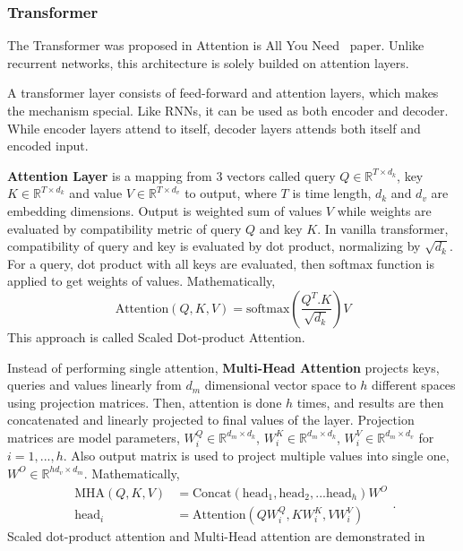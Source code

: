 \subsubsection{Transformer}

The Transformer was proposed in Attention is All You Need~ \cite{vaswani_attention_2017} paper. 
Unlike recurrent networks, this architecture is solely builded on attention layers. 

A transformer layer consists of feed-forward and attention layers, which makes the mechanism special. 
Like RNNs, it can be used as both encoder and decoder. 
While encoder layers attend to itself, decoder layers attends both itself and encoded input. 

\textbf{Attention Layer} is a mapping from 3 vectors called query $Q \in \mathbb{R}^{T \times d_k}$, key $K \in \mathbb{R}^{T \times d_k}$ and value $V \in \mathbb{R}^{T \times d_v}$ to output, 
where $T$ is time length, $d_k$ and $d_v$ are embedding dimensions. 
Output is weighted sum of values $V$ while weights are evaluated by compatibility metric of query $Q$ and key $K$. 
In vanilla transformer, compatibility of query and key is evaluated by dot product, normalizing by $\sqrt{d_k}$. 
For a query, dot product with all keys are evaluated, then softmax function is applied to get weights of values. Mathematically, 
\begin{equation}
\mathrm{Attention}(Q, K, V) = \mathrm{softmax}(\frac{Q^{T}. K}{\sqrt{d_k}}) V
\end{equation}
This approach is called Scaled Dot-product Attention. 

Instead of performing single attention, \textbf{Multi-Head Attention} projects keys, queries and values linearly from $d_m$ dimensional vector space to $h$ different spaces using projection matrices. 
Then, attention is done $h$ times, and results are then concatenated and linearly projected to final values of the layer.
Projection matrices are model parameters, $W^Q_i \in \mathbb{R}^{d_m \times d_k}$, $W^K_i \in \mathbb{R}^{d_m \times d_k}$, $W^V_i \in \mathbb{R}^{d_m \times d_v}$ for $i=1,...,h$. 
Also output matrix is used to project multiple values into single one, $W^O \in \mathbb{R}^{h d_v \times d_m}$. Mathematically, 
\begin{equation}
\begin{split}
\mathrm{MHA}(Q,K,V) &=  \text{Concat}(\mathrm{head}_1, \mathrm{head}_2, ... \mathrm{head}_h)W^O \\
\mathrm{head}_i &=  \text{Attention}(QW^Q_i,KW^K_i,VW^V_i)
\end{split}.
\end{equation}
Scaled dot-product attention and Multi-Head attention are demonstrated in 

